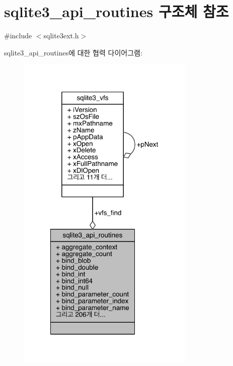 \hypertarget{structsqlite3__api__routines}{}\section{sqlite3\+\_\+api\+\_\+routines 구조체 참조}
\label{structsqlite3__api__routines}


{\ttfamily \#include $<$sqlite3ext.\+h$>$}



sqlite3\+\_\+api\+\_\+routines에 대한 협력 다이어그램\+:
\nopagebreak
\begin{figure}[H]
\begin{center}
\leavevmode
\includegraphics[width=240pt]{structsqlite3__api__routines__coll__graph}
\end{center}
\end{figure}
